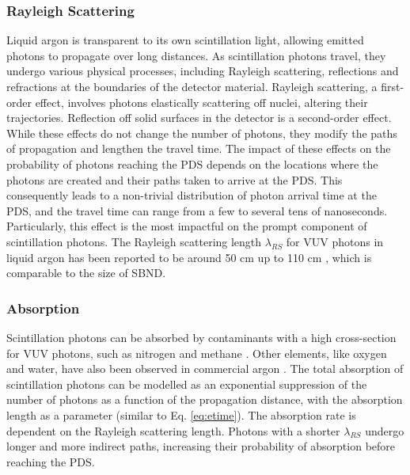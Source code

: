 \subsubsection{Rayleigh Scattering}

Liquid argon is transparent to its own scintillation light, allowing emitted photons to propagate over long distances. 
As scintillation photons travel, they undergo various physical processes, including Rayleigh scattering, reflections and refractions at the boundaries of the detector material.
Rayleigh scattering, a first-order effect, involves photons elastically scattering off nuclei, altering their trajectories. 
Reflection off solid surfaces in the detector is a second-order effect. 
While these effects do not change the number of photons, they modify the paths of propagation and lengthen the travel time. 
The impact of these effects on the probability of photons reaching the PDS depends on the locations where the photons are created and their paths taken to arrive at the PDS. 
This consequently leads to a non-trivial distribution of photon arrival time at the PDS, and the travel time can range from a few to several tens of nanoseconds.
Particularly, this effect is the most impactful on the prompt component of scintillation photons.
The Rayleigh scattering length $\lambda_{RS}$ for VUV photons in liquid argon has been reported to be around 50 cm \cite{rayleigh50} up to 110 cm \cite{rayleigh110}, which is comparable to the size of SBND.


\subsubsection{Absorption}
Scintillation photons can be absorbed by contaminants with a high cross-section for VUV photons, such as nitrogen \cite{photon_nitrogen} and methane \cite{photon_methane}. 
Other elements, like oxygen and water, have also been observed in commercial argon \cite{photon_commercial}. 
The total absorption of scintillation photons can be modelled as an exponential suppression of the number of photons as a function of the propagation distance, with the absorption length as a parameter (similar to Eq. \ref{eq:etime}).
The absorption rate is dependent on the Rayleigh scattering length. 
Photons with a shorter $\lambda_{RS}$ undergo longer and more indirect paths, increasing their probability of absorption before reaching the PDS.

